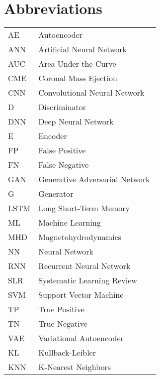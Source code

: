 \chapter*{Abbreviations}

\begin{flushleft}
\begin{tabular}{l p{0.8\linewidth}}
AE    & Autoencoder\\
ANN    & Artificial Neural Network\\
AUC   & Area Under the Curve\\
CME      & Coronal Mass Ejection\\
CNN     & Convolutional Neural Network\\
D   & Discriminator\\
DNN     & Deep Neural Network\\
E  & Encoder\\
FP   & False Positive\\
FN  & False Negative\\
GAN      & Generative Adversarial Network\\
G   & Generator\\
LSTM    & Long Short-Term Memory\\
ML     & Machine Learning\\
MHD   & Magnetohydrodynamics\\
NN      & Neural Network\\
RNN    & Recurrent Neural Network\\
SLR    & Systematic Learning Review\\
SVM    & Support Vector Machine\\
TP  & True Positive\\
TN  & True Negative\\
VAE    & Variational Autoencoder\\
KL    & Kullback-Leibler\\
KNN    & K-Nearest Neighbors\\




\end{tabular}
\end{flushleft}

